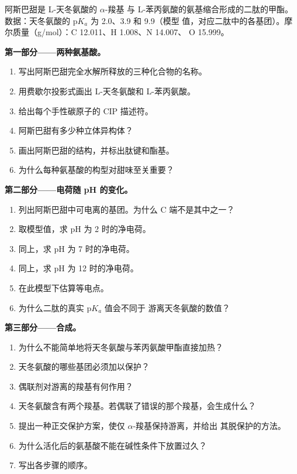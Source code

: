 \begin{problem}
\label{pb:b2:biomolecules:1}
阿斯巴甜是 L-天冬氨酸的 $\alpha$-羧基
与 L-苯丙氨酸的氨基缩合形成的二肽的甲酯。数据：天冬氨酸的 $\mathrm pK_a$ 为 2.0、3.9 和 9.9（模型
值，对应二肽中的各基团）。摩尔质量（\unit{g/mol}）：C 12.011、H 1.008、N 14.007、
O 15.999。

\medskip
\noindent\textbf{第一部分——两种氨基酸。}
\begin{enumerate}
  \item 写出阿斯巴甜完全水解所释放的三种化合物的名称。
  \item 用费歇尔投影式画出 L-天冬氨酸和 L-苯丙氨酸。
  \item 给出每个手性碳原子的 CIP 描述符。
  \item 阿斯巴甜有多少种立体异构体？
  \item 画出阿斯巴甜的结构，并标出肽键和酯基。
  \item 为什么每种氨基酸的构型对甜味至关重要？
\end{enumerate}

\medskip
\noindent\textbf{第二部分——电荷随 pH 的变化。}
\begin{enumerate}[resume]
  \item 列出阿斯巴甜中可电离的基团。为什么 C 端不是其中之一？
  \item 取模型值，求 pH 为 2 时的净电荷。
  \item 同上，求 pH 为 7 时的净电荷。
  \item 同上，求 pH 为 12 时的净电荷。
  \item 在此模型下估算等电点。
  \item 为什么二肽的真实 $\mathrm pK_a$ 值会不同于
        游离天冬氨酸的数值？
\end{enumerate}

\medskip
\noindent\textbf{第三部分——合成。}
\begin{enumerate}[resume]
  \item 为什么不能简单地将天冬氨酸与苯丙氨酸甲酯直接加热？
  \item 天冬氨酸的哪些基团必须加以保护？
  \item 偶联剂对游离的羧基有何作用？
  \item 天冬氨酸含有两个羧基。若偶联了错误的那个羧基，会生成什么？
  \item 提出一种正交保护方案，使仅 $\alpha$-羧基保持游离，并给出
        其脱保护的方法。
  \item 为什么活化后的氨基酸不能在碱性条件下放置过久？
  \item 写出各步骤的顺序。
\end{enumerate}


\end{problem}
